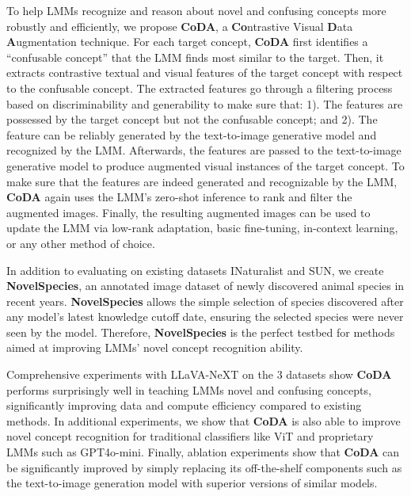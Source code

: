 To help LMMs recognize and reason about novel and confusing concepts more robustly and efficiently, we propose \textbf{CoDA}, a \textbf{Co}ntrastive Visual \textbf{D}ata \textbf{A}ugmentation technique. For each target concept, \textbf{CoDA} first identifies a ``confusable concept'' that the LMM finds most similar to the target. Then, it extracts contrastive textual and visual features of the target concept with respect to the confusable concept. The extracted features go through a filtering process based on discriminability and generability to make sure that: 1). The features are possessed by the target concept but not the confusable concept; and 2). The feature can be reliably generated by the text-to-image generative model and recognized by the LMM. Afterwards, the features are passed to the text-to-image generative model to produce augmented visual instances of the target concept. To make sure that the features are indeed generated and recognizable by the LMM, \textbf{CoDA} again uses the LMM's zero-shot inference to rank and filter the augmented images. Finally, the resulting augmented images can be used to update the LMM via low-rank adaptation, basic fine-tuning, in-context learning, or any other method of choice.

In addition to evaluating on existing datasets INaturalist and SUN, we create \textbf{NovelSpecies}, an annotated image dataset of newly discovered animal species in recent years. \textbf{NovelSpecies} allows the simple selection of species discovered after any model's latest knowledge cutoff date, ensuring the selected species were never seen by the model. Therefore, \textbf{NovelSpecies} is the perfect testbed for methods aimed at improving LMMs' novel concept recognition ability.

Comprehensive experiments with LLaVA-NeXT on the 3 datasets show \textbf{CoDA} performs surprisingly well in teaching LMMs novel and confusing concepts, significantly improving data and compute efficiency compared to existing methods. In additional experiments, we show that \textbf{CoDA} is also able to improve novel concept recognition for traditional classifiers like ViT and proprietary LMMs such as GPT4o-mini. Finally, ablation experiments show that \textbf{CoDA} can be significantly improved by simply replacing its off-the-shelf components such as the text-to-image generation model with superior versions of similar models.





